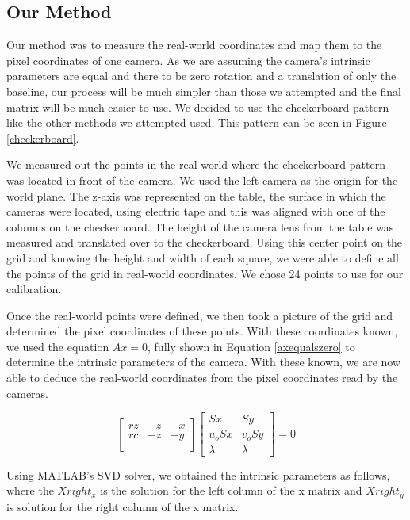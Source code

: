 \documentclass{IEEEtran}
\begin{document}
\subsection{Our Method}
Our method was to measure the real-world coordinates and map them to the pixel coordinates of one camera. As we are assuming the camera’s intrinsic parameters are equal and there to be zero rotation and a translation of only the baseline, our process will be much simpler than those we attempted and the final matrix will be much easier to use. We decided to use the checkerboard pattern like the other methods we attempted used. This pattern can be seen in Figure \ref{checkerboard}. 

We measured out the points in the real-world where the checkerboard pattern was located in front of the camera. We used the left camera as the origin for the world plane. The z-axis was represented on the table, the surface in which the cameras were located, using electric tape and this was aligned with one of the columns on the checkerboard. The height of the camera lens from the table was measured and translated over to the checkerboard. Using this center point on the grid and knowing the height and width of each square, we were able to define all the points of the grid in real-world coordinates. We chose 24 points to use for our calibration. 

Once the real-world points were defined, we then took a picture of the grid and determined the pixel coordinates of these points. With these coordinates known, we used the equation $Ax=0$, fully shown in Equation \ref{axequalszero} to determine the intrinsic parameters of the camera. With these known, we are now able to deduce the real-world coordinates from the pixel coordinates read by the cameras.


\begin{equation}
\label{axequalszero}
\left[\begin{smallmatrix} rz & -z & -x \\ rc & -z & -y \\ \end{smallmatrix} \right]  \left[\begin{smallmatrix} Sx & Sy\\ u_oSx & v_oSy\\ \lambda & \lambda \end{smallmatrix} \right] = 0
\end{equation}


Using MATLAB's SVD solver, we obtained the intrinsic parameters as follows, where the $Xright_x$ is the solution for the left column of the x matrix and $Xright_y$ is solution for the right column of the x matrix.
\end{document}
